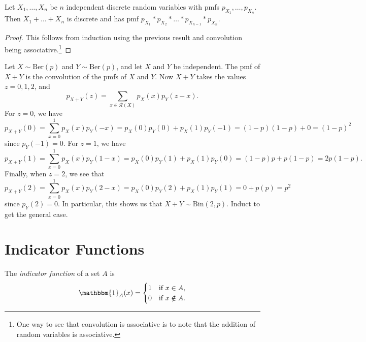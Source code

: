 \begin{prop}
  Let $X_1, \dots, X_n$ be $n$ independent discrete
  random variables with pmfs $p_{X_1}, \dots, p_{X_n}$. Then
  $X_1 + \dots + X_n$ is discrete and has pmf
  $p_{X_1} * p_{X_2} * \dots * p_{X_{n - 1}} * p_{X_n}$.
\end{prop}

\begin{proof}
  This follows from induction using the previous
  result and convolution being
  associative.\footnote{One way to see that convolution is associative is to note that the addition of random variables is associative.}
\end{proof}

\begin{example}
  Let $X \sim \mathrm{Ber}(p)$ and $Y \sim \mathrm{Ber}(p)$,
  and let $X$ and $Y$ be independent. The pmf of
  $X + Y$ is the convolution of the pmfs of $X$ and $Y$.
  Now $X + Y$ takes the values $z = 0, 1, 2$, and
  \[
    p_{X + Y}(z) = \sum_{x \in \mathcal{R}(X)} p_X(x) p_Y(z - x).
  \]
  For $z = 0$, we have
  \[
    p_{X + Y}(0) = \sum_{x = 0}^1 p_X(x) p_Y(-x)
    = p_X(0) p_Y(0) + p_X(1) p_Y(-1)
    = (1 - p)(1 - p) + 0 = (1 - p)^2
  \]
  since $p_Y(-1) = 0$. For $z = 1$, we have
  \[
    p_{X + Y}(1) = \sum_{x = 0}^1 p_X(x) p_Y(1 - x)
    = p_X(0) p_Y(1) + p_X(1) p_Y(0)
    = (1 - p)p + p(1 - p) = 2p(1 - p).
  \]
  Finally, when $z = 2$, we see that
  \[
    p_{X + Y}(2) = \sum_{x = 0}^1 p_X(x) p_Y(2 - x)
    = p_X(0) p_Y(2) + p_X(1) p_Y(1)
    = 0 + p(p) = p^2
  \]
  since $p_Y(2) = 0$. In particular, this shows us
  that $X + Y \sim \mathrm{Bin}(2, p)$. Induct
  to get the general case.
\end{example}

\section{Indicator Functions}

\begin{definition}
  The \emph{indicator function} of a set $A$ is
  \[
    \mathbbm{1}_A(x) = \begin{cases}
      1 & \text{if } x \in A, \\
      0 & \text{if } x \notin A.
    \end{cases}
  \]
\end{definition}

